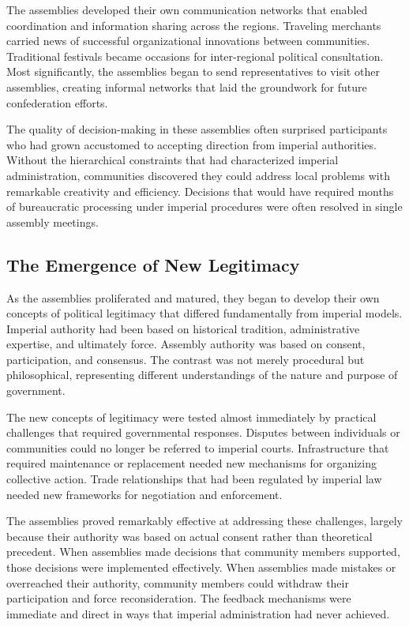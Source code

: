 The assemblies developed their own communication networks that enabled
coordination and information sharing across the regions. Traveling
merchants carried news of successful organizational innovations between
communities. Traditional festivals became occasions for inter-regional
political consultation. Most significantly, the assemblies began to send
representatives to visit other assemblies, creating informal networks
that laid the groundwork for future confederation efforts.

The quality of decision-making in these assemblies often surprised
participants who had grown accustomed to accepting direction from
imperial authorities. Without the hierarchical constraints that had
characterized imperial administration, communities discovered they could
address local problems with remarkable creativity and efficiency.
Decisions that would have required months of bureaucratic processing
under imperial procedures were often resolved in single assembly
meetings.

\subsection{The Emergence of New
Legitimacy}\label{the-emergence-of-new-legitimacy}

As the assemblies proliferated and matured, they began to develop their
own concepts of political legitimacy that differed fundamentally from
imperial models. Imperial authority had been based on historical
tradition, administrative expertise, and ultimately force. Assembly
authority was based on consent, participation, and consensus. The
contrast was not merely procedural but philosophical, representing
different understandings of the nature and purpose of government.

The new concepts of legitimacy were tested almost immediately by
practical challenges that required governmental responses. Disputes
between individuals or communities could no longer be referred to
imperial courts. Infrastructure that required maintenance or replacement
needed new mechanisms for organizing collective action. Trade
relationships that had been regulated by imperial law needed new
frameworks for negotiation and enforcement.

The assemblies proved remarkably effective at addressing these
challenges, largely because their authority was based on actual consent
rather than theoretical precedent. When assemblies made decisions that
community members supported, those decisions were implemented
effectively. When assemblies made mistakes or overreached their
authority, community members could withdraw their participation and
force reconsideration. The feedback mechanisms were immediate and direct
in ways that imperial administration had never achieved.

